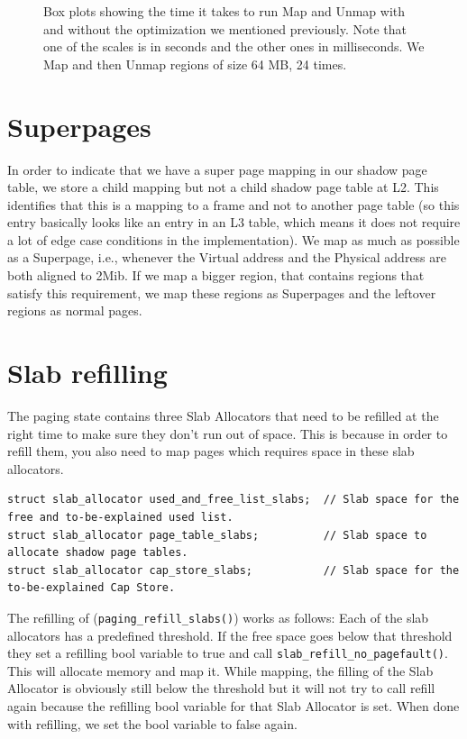 \begin{figure}[ht]
    \centering
         \subfloat[\centering ]{{\scalebox{0.5}{ }}}
         \subfloat[\centering ]{{\scalebox{0.5}{ }}}

    \caption{Box plots showing the time it takes to run Map and Unmap with and without the optimization we mentioned previously. Note that one of the scales is in seconds and the other ones in milliseconds. We Map and then Unmap regions of size 64 MB, 24 times.}
    \label{fig:paging_map}
\end{figure}


\section{Superpages}

In order to indicate that we have a super page mapping in our shadow page table, we store a child mapping but not a child shadow page table at L2.
This identifies that this is a mapping to a frame and not to another page table (so this entry basically looks like an entry in an L3 table, which means it does not require a lot of edge case conditions in the implementation). 
We map as much as possible as a Superpage, i.e., whenever the Virtual address and the Physical address are both aligned to 2Mib. If we map a bigger region, that contains regions that satisfy this requirement, we map these regions as Superpages and the leftover regions as normal pages. 

\section{Slab refilling}
The paging state contains three Slab Allocators that need to be refilled at the right time to make sure they don't run out of space. This is because in order to refill them, you also need to map pages which requires space in these slab allocators.

\begin{verbatim}
struct slab_allocator used_and_free_list_slabs;  // Slab space for the free and to-be-explained used list.
struct slab_allocator page_table_slabs;          // Slab space to allocate shadow page tables.
struct slab_allocator cap_store_slabs;           // Slab space for the to-be-explained Cap Store.
\end{verbatim}

The refilling of (\texttt{paging_refill_slabs()}) works as follows: Each of the slab allocators has a predefined threshold. If the free space goes below that threshold they set a refilling bool variable to true and call \texttt{slab_refill_no_pagefault()}. This will allocate memory and map it. While mapping, the filling of the Slab Allocator is obviously still below the threshold but it will not try to call refill again because the refilling bool variable for that Slab Allocator is set. When done with refilling, we set the bool variable to false again. 

